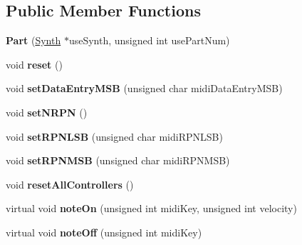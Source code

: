 \subsection*{Public Member Functions}
\begin{DoxyCompactItemize}
\item 
\hypertarget{classMT32Emu_1_1Part_aca0bfd7eef42795b209f56166f280941}{{\bfseries Part} (\hyperlink{classMT32Emu_1_1Synth}{Synth} $\ast$use\-Synth, unsigned int use\-Part\-Num)}\label{classMT32Emu_1_1Part_aca0bfd7eef42795b209f56166f280941}

\item 
\hypertarget{classMT32Emu_1_1Part_a173808f6ad5a9791b0364dc0cbede8ec}{void {\bfseries reset} ()}\label{classMT32Emu_1_1Part_a173808f6ad5a9791b0364dc0cbede8ec}

\item 
\hypertarget{classMT32Emu_1_1Part_aebe9c656c99f0b981516744bdd45053e}{void {\bfseries set\-Data\-Entry\-M\-S\-B} (unsigned char midi\-Data\-Entry\-M\-S\-B)}\label{classMT32Emu_1_1Part_aebe9c656c99f0b981516744bdd45053e}

\item 
\hypertarget{classMT32Emu_1_1Part_a79d2c0a6c953ec1c6a3713a2e3c89b63}{void {\bfseries set\-N\-R\-P\-N} ()}\label{classMT32Emu_1_1Part_a79d2c0a6c953ec1c6a3713a2e3c89b63}

\item 
\hypertarget{classMT32Emu_1_1Part_a06f0226c13f18d72dc14c90bac20e802}{void {\bfseries set\-R\-P\-N\-L\-S\-B} (unsigned char midi\-R\-P\-N\-L\-S\-B)}\label{classMT32Emu_1_1Part_a06f0226c13f18d72dc14c90bac20e802}

\item 
\hypertarget{classMT32Emu_1_1Part_a0e39602d144211cc71b797f84a56231d}{void {\bfseries set\-R\-P\-N\-M\-S\-B} (unsigned char midi\-R\-P\-N\-M\-S\-B)}\label{classMT32Emu_1_1Part_a0e39602d144211cc71b797f84a56231d}

\item 
\hypertarget{classMT32Emu_1_1Part_a35b766410586cc74764b6038f0247ddc}{void {\bfseries reset\-All\-Controllers} ()}\label{classMT32Emu_1_1Part_a35b766410586cc74764b6038f0247ddc}

\item 
\hypertarget{classMT32Emu_1_1Part_ae11a0ff355dea8b233b16dfb9764442d}{virtual void {\bfseries note\-On} (unsigned int midi\-Key, unsigned int velocity)}\label{classMT32Emu_1_1Part_ae11a0ff355dea8b233b16dfb9764442d}

\item 
\hypertarget{classMT32Emu_1_1Part_a26a452268b1a98a054e5ad2908dba2f0}{virtual void {\bfseries note\-Off} (unsigned int midi\-Key)}\label{classMT32Emu_1_1Part_a26a452268b1a98a054e5ad2908dba2f0}


\end{DoxyCompactItemize}
